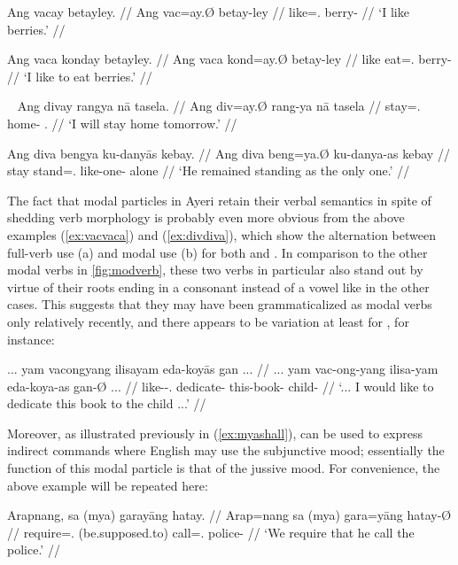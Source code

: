 \pex\label{ex:vacvaca}
\a\label{ex:vacfull}\begingl
	\gla Ang vacay betayley. //
	\glb Ang vac=ay.Ø betay-ley //
	\glc \AgtT{} like=\Fsg{}.\Top{} berry-\PargI{} //
	\glft `I like berries.' //
\endgl

\a\label{ex:vacamod}\begingl
	\gla Ang vaca konday betayley. //
	\glb Ang vaca kond=ay.Ø betay-ley //
	\glc \AgtT{} like eat=\Fsg{}.\Top{} berry-\PargI{} //
	\glft `I like to eat berries.' //
\endgl
\xe

\pex~\label{ex:divdiva}
\a\label{ex:divfull}\begingl
	\gla Ang divay rangya nā tasela. //
	\glb Ang div=ay.Ø rang-ya nā tasela //
	\glc \AgtT{} stay=\Fsg{}.\Top{} home-\Loc{} \Fsg{}.\Gen{} //
	\glft `I will stay home tomorrow.' //
\endgl

\a\label{ex:divamod}\begingl
	\gla Ang diva bengya ku-danyās kebay. //
	\glb Ang diva beng=ya.Ø ku-danya-as kebay //
	\glc \AgtT{} stay stand=\TsgM{}.\Top{} like-one-\Parg{} alone //
	\glft `He remained standing as the only one.' //
\endgl
\xe

The fact that modal particles in Ayeri retain their verbal semantics in spite 
of shedding verb morphology is probably even more obvious from the above 
examples (\ref{ex:vacvaca}) and (\ref{ex:divdiva}), which show the alternation 
between full-verb use (a) and modal use (b) for both  and 
. In comparison to the other modal verbs in 
\autoref{fig:modverb}, these two verbs in particular also stand out by virtue 
of their roots ending in a consonant instead of a vowel like in the other 
cases. This suggests that they may have been grammaticalized as modal verbs 
only relatively recently, and there appears to be variation at least for 
, for instance:

\ex\begingl
	\gla ... yam vacongyang ilisayam eda-koyās gan ... //
	\glb ... yam vac-ong-yang ilisa-yam eda-koya-as gan-Ø ... //
	\glc {} \DatT{} like-\Irr{}-\Fsg{}.\Aarg{} dedicate-\Ptcp{} 		
		this-book-\Parg{} child-\Top{} {} //
	\glft `... I would like to dedicate this book to the child ...' 
		 //
\endgl\xe

Moreover, as illustrated previously in (\ref{ex:myashall}),  can be used to express indirect commands where English may 
use the subjunctive mood; essentially the function of this modal particle is 
that of the jussive mood. For convenience, the above example will be repeated 
here:

\ex\begingl
	\gla Arapnang, sa (mya) garayāng hatay. //
	\glb Arap=nang sa (mya) gara=yāng hatay-Ø //
	\glc require=\Fpl{}.\Aarg{} \PatT{} (be.supposed.to) 
		call=\TsgM{}.\Aarg{} police-\Top{} //
	\glft `We require that he call the police.' //
\endgl\xe

